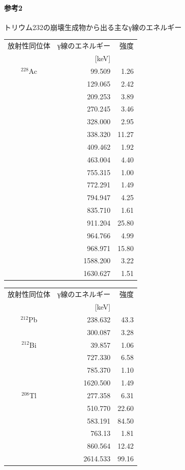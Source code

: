 \paragraph{参考2}
トリウム232の崩壊生成物から出る主なγ線のエネルギー\\
\begin{tabular}[t]{|c|r|r|}
\hline
放射性同位体 & γ線のエネルギー& 強度\\
& [keV] &　\\
\hline\hline
${}^{228}$Ac & 99.509 & 1.26\\
& 129.065 & 2.42\\
& 209.253 & 3.89\\
& 270.245 & 3.46\\
& 328.000 & 2.95\\
& 338.320 & 11.27\\
& 409.462 & 1.92\\
& 463.004 & 4.40\\
& 755.315 & 1.00\\
& 772.291 & 1.49\\
& 794.947 & 4.25\\
& 835.710 & 1.61\\
& 911.204 & 25.80\\
& 964.766 & 4.99\\
& 968.971 & 15.80\\
& 1588.200 & 3.22\\
& 1630.627 & 1.51\\
\hline
\end{tabular}
\begin{tabular}[t]{|c|r|r|}
\hline
放射性同位体 & γ線のエネルギー& 強度\\
& [keV] &　\\
\hline\hline
${}^{212}$Pb & 238.632 & 43.3\\
& 300.087 & 3.28 \\
\hline
${}^{212}$Bi & 39.857 & 1.06\\
& 727.330 & 6.58\\
& 785.370 & 1.10\\
& 1620.500 & 1.49\\
\hline
${}^{208}$Tl & 277.358 & 6.31\\
& 510.770 & 22.60\\
& 583.191 & 84.50\\
& 763.13 & 1.81\\
& 860.564 & 12.42\\
& 2614.533 & 99.16\\
\hline
\end{tabular}
